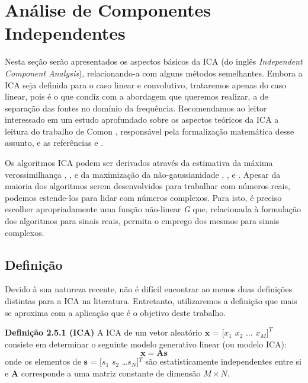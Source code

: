 \section{Análise de Componentes Independentes} \label{sec:ICA}
    Nesta seção serão apresentados os aspectos básicos da ICA (do inglês \textit{Independent Component Analysis}), relacionando-a com alguns métodos semelhantes. Embora a ICA seja definida para o caso linear e convolutivo, trataremos apenas do caso linear, pois é o que condiz com a abordagem que queremos realizar, a de separação das fontes no domínio da frequência. Recomendamos ao leitor interessado em um estudo aprofundado sobre os aspectos teóricos da ICA a leitura do trabalho de Comon \cite{Comon}, responsável pela formalização matemática desse assunto, e as referências \cite{ICA3} e \cite{ICA}.
    
    Os algoritmos ICA podem ser derivados através da estimativa da máxima verossimilhança \cite{ICAML}, \cite{ML}, \cite{NaturalICA} e da maximização da não-gaussianidade \cite{fastica1}, \cite{fastica2}, \cite{fastica3} e \cite{fasticaebm}. Apesar da maioria dos algoritmos serem desenvolvidos para trabalhar com números reais, podemos estende-los para lidar com números complexos. Para isto, é preciso escolher apropriadamente uma função não-linear \textit{G} que, relacionada à formulação dos algoritmos para sinais reais, permita o emprego dos mesmos para sinais complexos.

\subsection{Definição}
    Devido à sua natureza recente, não é difícil encontrar ao menos duas definições distintas para a ICA na literatura. Entretanto, utilizaremos a definição que mais se aproxima com a aplicação que é o objetivo deste trabalho.
    
    \medskip
    
    \textbf{Definição 2.5.1 (ICA)} A ICA de um vetor aleatório $\mathbf{x}$ = [${x_1}$ ${x_2}$ $\dots$  ${x_M}]^T$ consiste em determinar o seguinte modelo generativo linear (ou modelo ICA):
    \begin{equation}\label{eq:simplifiedmixer}
        \mathbf{x} = \mathbf{A}\mathbf{s}
    \end{equation}
    onde os elementos de $\mathbf{s}$ = [${s_1}$ ${s_2}$ \dots  ${s_N}$]$^T$ são estatisticamente independentes entre si e $\mathbf{A}$ corresponde a uma matriz constante de dimensão $M\times N$.

